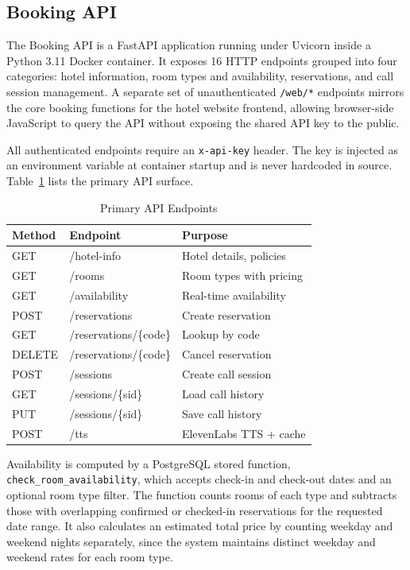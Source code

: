 \documentclass[conference]{IEEEtran}
\begin{document}
\subsection{Booking API}

The Booking API is a FastAPI application running under Uvicorn inside a
Python 3.11 Docker container. It exposes 16 HTTP endpoints grouped into four
categories: hotel information, room types and availability, reservations, and
call session management. A separate set of unauthenticated \texttt{/web/*}
endpoints mirrors the core booking functions for the hotel website frontend,
allowing browser-side JavaScript to query the API without exposing the
shared API key to the public.

All authenticated endpoints require an \texttt{x-api-key} header. The key is
injected as an environment variable at container startup and is never hardcoded
in source. Table~\ref{tab:endpoints} lists the primary API surface.

\begin{table}[!h]
\caption{Primary API Endpoints}
\label{tab:endpoints}
\centering
\scriptsize
\setlength{\tabcolsep}{4pt}
\begin{tabular}{@{}lll@{}}
\toprule
\textbf{Method} & \textbf{Endpoint} & \textbf{Purpose} \\
\midrule
GET    & /hotel-info              & Hotel details, policies \\
GET    & /rooms                   & Room types with pricing \\
GET    & /availability            & Real-time availability \\
POST   & /reservations            & Create reservation \\
GET    & /reservations/\{code\}   & Lookup by code \\
DELETE & /reservations/\{code\}   & Cancel reservation \\
POST   & /sessions                & Create call session \\
GET    & /sessions/\{sid\}        & Load call history \\
PUT    & /sessions/\{sid\}        & Save call history \\
POST   & /tts                     & ElevenLabs TTS + cache \\
\bottomrule
\end{tabular}
\end{table}

Availability is computed by a PostgreSQL stored function,
\texttt{check\_room\_availability}, which accepts check-in and check-out dates
and an optional room type filter. The function counts rooms of each type and
subtracts those with overlapping confirmed or checked-in reservations for the
requested date range. It also calculates an estimated total price by counting
weekday and weekend nights separately, since the system maintains distinct
weekday and weekend rates for each room type.
\end{document}
